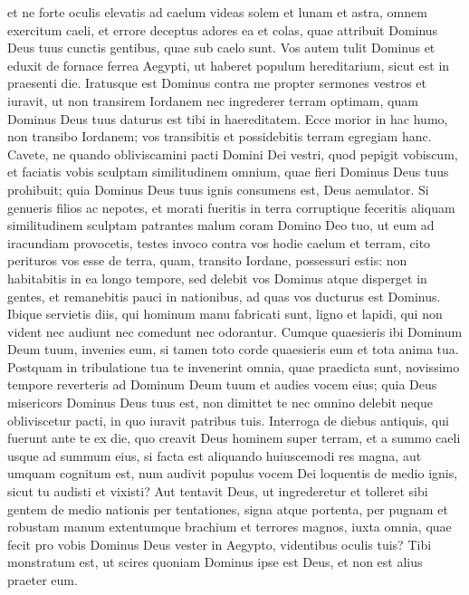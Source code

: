 \begin{biblechapter}
\verse et ne forte oculis elevatis ad caelum videas solem et lunam et astra, omnem exercitum caeli, et errore deceptus adores ea et colas, quae attribuit Dominus Deus tuus cunctis gentibus, quae sub caelo sunt.  
\verse Vos autem tulit Dominus et eduxit de fornace ferrea Aegypti, ut haberet populum hereditarium, sicut est in praesenti die. 
\verse Iratusque est Dominus contra me propter sermones vestros et iuravit, ut non transirem Iordanem nec ingrederer terram optimam, quam Dominus Deus tuus daturus est tibi in haereditatem. 
\verse Ecce morior in hac humo, non transibo Iordanem; vos transibitis et possidebitis terram egregiam hanc. 
\verse Cavete, ne quando obliviscamini pacti Domini Dei vestri, quod pepigit vobiscum, et faciatis vobis sculptam similitudinem omnium, quae fieri Dominus Deus tuus prohibuit; 
\verse quia Dominus Deus tuus ignis consumens est, Deus aemulator. 
\verse Si genueris filios ac nepotes, et morati fueritis in terra corruptique feceritis aliquam similitudinem sculptam patrantes malum coram Domino Deo tuo, ut eum ad iracundiam provocetis, 
\verse testes invoco contra vos hodie caelum et terram, cito perituros vos esse de terra, quam, transito Iordane, possessuri estis: non habitabitis in ea longo tempore, sed delebit vos Dominus 
\verse atque disperget in gentes, et remanebitis pauci in nationibus, ad quas vos ducturus est Dominus. 
\verse Ibique servietis diis, qui hominum manu fabricati sunt, ligno et lapidi, qui non vident nec audiunt nec comedunt nec odorantur. 
\verse Cumque quaesieris ibi Dominum Deum tuum, invenies eum, si tamen toto corde quaesieris eum et tota anima tua. 
\verse Postquam in tribulatione tua te invenerint omnia, quae praedicta sunt, novissimo tempore reverteris ad Dominum Deum tuum et audies vocem eius; 
\verse quia Deus misericors Dominus Deus tuus est, non dimittet te nec omnino delebit neque obliviscetur pacti, in quo iuravit patribus tuis. 
\verse Interroga de diebus antiquis, qui fuerunt ante te ex die, quo creavit Deus hominem super terram, et a summo caeli usque ad summum eius, si facta est aliquando huiuscemodi res magna, aut umquam cognitum est, 
\verse num audivit populus vocem Dei loquentis de medio ignis, sicut tu audisti et vixisti? 
\verse Aut tentavit Deus, ut ingrederetur et tolleret sibi gentem de medio nationis per tentationes, signa atque portenta, per pugnam et robustam manum extentumque brachium et terrores magnos, iuxta omnia, quae fecit pro vobis Dominus Deus vester in Aegypto, videntibus oculis tuis? 
\verse Tibi monstratum est, ut scires quoniam Dominus ipse est Deus, et non est alius praeter eum. 

\end{biblechapter}

